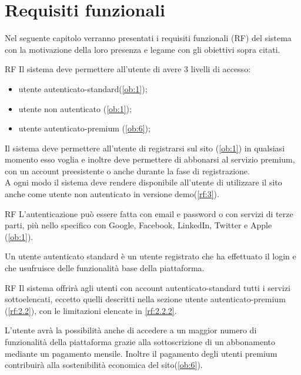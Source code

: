 \section{Requisiti funzionali}
\label{sec:RequisitiFunzionali}

Nel seguente capitolo verranno presentati i requisiti funzionali (RF) del sistema con la motivazione della loro presenza e legame con gli obiettivi sopra citati.
\begin {listaPersonale}{RF}
Il sistema deve permettere all'utente di avere 3 livelli di accesso:
\begin{itemize}
	\item utente autenticato-standard(\ref{ob:1});
    \item utente non autenticato (\ref{ob:1}); 
    \item utente autenticato-premium (\ref{ob:6});
\end{itemize}
Il sistema deve permettere all'utente di registrarsi sul sito (\ref{ob:1}) in qualsiasi momento esso voglia e inoltre deve permettere di abbonarsi al servizio premium, con un account preesistente o anche durante la fase di registrazione.\\
A ogni modo il sistema deve rendere disponibile all'utente di utilizzare il sito anche come utente non autenticato in versione demo(\ref{rf:3}). 


\begin {listaPersonale2}{RF}
L'autenticazione può essere fatta con email e password o con servizi di terze parti, più nello specifico con Google, Facebook, LinkedIn, Twitter e Apple (\ref{ob:1}).
\end {listaPersonale2}


Un utente autenticato standard è un utente registrato che ha effettuato il login e che usufruisce delle funzionalità base della piattaforma.

\begin {listaPersonale2}{RF}
Il sistema offrirà agli utenti con account autenticato-standard tutti i servizi sottoelencati, eccetto quelli descritti nella sezione utente autenticato-premium (\ref{rf:2.2}), con le limitazioni elencate in \ref{rf:2.2.2}.

L'utente avrà la possibilità anche di accedere a un maggior numero di funzionalità della piattaforma grazie alla sottoscrizione di un abbonamento mediante un pagamento mensile.
Inoltre il pagamento degli utenti premium contribuirà alla sostenibilità economica del sito(\ref{ob:6}).


\end{listaPersonale2}
\end{listaPersonale}
